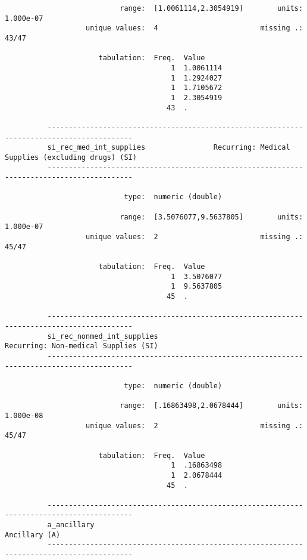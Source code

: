 \documentclass{article}
\begin{document}
\begin{verbatim}
                           range:  [1.0061114,2.3054919]        units:  1.000e-07
                   unique values:  4                        missing .:  43/47
          
                      tabulation:  Freq.  Value
                                       1  1.0061114
                                       1  1.2924027
                                       1  1.7105672
                                       1  2.3054919
                                      43  .
          
          ------------------------------------------------------------------------------------------
          si_rec_med_int_supplies                Recurring: Medical Supplies (excluding drugs) (SI)
          ------------------------------------------------------------------------------------------
          
                            type:  numeric (double)
          
                           range:  [3.5076077,9.5637805]        units:  1.000e-07
                   unique values:  2                        missing .:  45/47
          
                      tabulation:  Freq.  Value
                                       1  3.5076077
                                       1  9.5637805
                                      45  .
          
          ------------------------------------------------------------------------------------------
          si_rec_nonmed_int_supplies                            Recurring: Non-medical Supplies (SI)
          ------------------------------------------------------------------------------------------
          
                            type:  numeric (double)
          
                           range:  [.16863498,2.0678444]        units:  1.000e-08
                   unique values:  2                        missing .:  45/47
          
                      tabulation:  Freq.  Value
                                       1  .16863498
                                       1  2.0678444
                                      45  .
          
          ------------------------------------------------------------------------------------------
          a_ancillary                                                                  Ancillary (A)
          ------------------------------------------------------------------------------------------
          

\end{verbatim}
\end{document}
